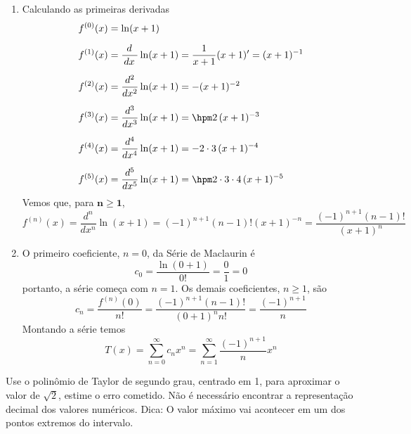 \documentclass[a4paper,12pt,fleqn]{article}
\begin{document}
\begin{answer}
  \begin{enumerate}[label=\alph*)]
    \item Calculando as primeiras derivadas
    \begin{align*}
      f^{(0)}(x) & = \ln(x+1) \\[2mm]
      f^{(1)}(x) & = \frac{\,d\;}{\,dx\;}\ln(x+1) = \frac{1}{x+1}(x+1)' = (x+1)^{-1} \\[2mm]
      f^{(2)}(x) & = \frac{d^2}{dx^2}    \ln(x+1) =    -                  (x+1)^{-2} \\[2mm]
      f^{(3)}(x) & = \frac{d^3}{dx^3}    \ln(x+1) = \hpm 2              \,(x+1)^{-3} \\[2mm]
      f^{(4)}(x) & = \frac{d^4}{dx^4}    \ln(x+1) =    - 2\cdot 3       \,(x+1)^{-4} \\[2mm]
      f^{(5)}(x) & = \frac{d^5}{dx^5}    \ln(x+1) = \hpm 2\cdot 3\cdot 4\,(x+1)^{-5}
    \end{align*}
    Vemos que, para $\bm{n\geq1}$,
    \[
      f^{(n)}(x)
      = \frac{d^n}{dx^n} \ln(x+1)
      = (-1)^{n+1} (n-1)! (x+1)^{-n}
      = \frac{(-1)^{n+1} (n-1)!}{(x+1)^n}
    \]
    \item O primeiro coeficiente, $n=0$, da Série de Maclaurin é
      \[
        c_0 = \frac{\ln(0+1)}{0!} = \frac{0}{1} = 0
      \]
      portanto, a série começa com $n=1$.
      Os demais coeficientes, $n\geq 1$, são
      \[
        c_n
        = \frac{f^{(n)}(0)}{n!}
        = \frac{(-1)^{n+1} (n-1)!}{(0+1)^nn!}
        = \frac{(-1)^{n+1}}{n}
      \]
      Montando a série temos
      \[
        T(x)
        = \sum_{n=0}^\infty c_n x^n
        = \sum_{n=1}^\infty \frac{(-1)^{n+1}}{n} x^n
      \]
  \end{enumerate}
\end{answer}

Use o polinômio de Taylor de segundo grau, centrado em 1, para aproximar o
valor de \(\sqrt{2}\), estime o erro cometido.
Não é necessário encontrar a representação decimal dos valores numéricos.
Dica: O valor máximo vai acontecer em um dos pontos extremos do intervalo.
\end{document}
